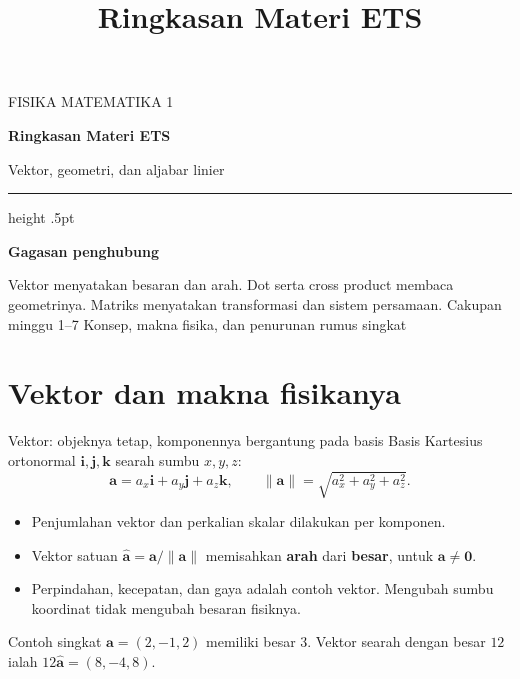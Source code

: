 \documentclass[11pt,aspectratio=169]{beamer}
\title{Ringkasan Materi ETS}
\author{}
\date{}
\newcommand{\vect}[1]{\boldsymbol{#1}}
\begin{document}
\begin{frame}[plain]
\vspace{8mm}
{\small\color{Accent}FISIKA MATEMATIKA 1}\par\vspace{4mm}
{\LARGE\bfseries Ringkasan Materi ETS}\par\vspace{3mm}
{\large Vektor, geometri, dan aljabar linier}\par\vspace{6mm}
{\color{Rule}\hrule height .5pt}\vspace{5mm}
\textbf{Gagasan penghubung}\par\smallskip
Vektor menyatakan besaran dan arah. Dot serta cross product membaca
geometrinya. Matriks menyatakan transformasi dan sistem persamaan.
\vfill
{\footnotesize\color{Muted}Cakupan minggu 1--7\enspace\textbullet\enspace
Konsep, makna fisika, dan penurunan rumus singkat}
\end{frame}

\section{Vektor dan makna fisikanya}

\begin{frame}{Vektor: objeknya tetap, komponennya bergantung pada basis}
Basis Kartesius ortonormal $\mathbf{i},\mathbf{j},\mathbf{k}$ searah sumbu $x,y,z$:
\[
\vect{a}=a_x\mathbf{i}+a_y\mathbf{j}+a_z\mathbf{k},
\qquad \|\vect{a}\|=\sqrt{a_x^2+a_y^2+a_z^2}.
\]
\begin{itemize}
\item Penjumlahan vektor dan perkalian skalar dilakukan per komponen.
\item Vektor satuan $\widehat{\vect{a}}=\vect{a}/\|\vect{a}\|$ memisahkan
\textbf{arah} dari \textbf{besar}, untuk $\vect{a}\ne\vect{0}$.
\item Perpindahan, kecepatan, dan gaya adalah contoh vektor.
Mengubah sumbu koordinat tidak mengubah besaran fisiknya.
\end{itemize}
\begin{block}{Contoh singkat}
$\vect{a}=(2,-1,2)$ memiliki besar $3$.
Vektor searah dengan besar $12$ ialah $12\widehat{\vect{a}}=(8,-4,8)$.
\end{block}
\end{frame}
\end{document}
